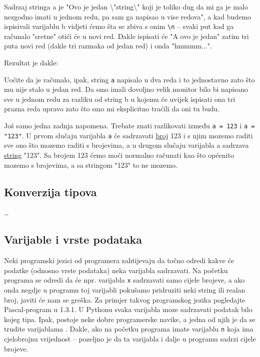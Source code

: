 	Sadrzaj stringa a je "Ovo je jedan $\setminus$"string$\setminus$" koji je toliko dug da mi ga je malo nezgodno imati u jednom redu, pa sam ga napisao u vise redova",
	a kad budemo ispisivali varijablu b vidjeti ćemo šta se zbiva s onim
	\verb+\n+ -- svaki put kad ga računalo "sretne" otići će u novi red.
	Dakle ispisati će "A ovo je jedan" zatim tri puta novi red (dakle tri razmaka
	od jedan red) i onda "hmmmm...".

	Rezultat je dakle:


Uočite da je računalo, ipak, string \verb+a+ napisalo u
dva reda i to jednostavno zato što mu nije stalo u jedan red.
Da smo imali dovoljno velik monitor bilo bi napisano sve u jednom
redu za razliku od string b u kojemu će uvijek ispisati ona
tri prazna reda upravo zato što smo mi eksplicitno traćili
da oni tu budu.

Još samo jedna zadnja napomena. Trebate znati razlikovati
između \verb+a = 123+ i \verb+a = "123"+. U prvom slučaju
varijabla \verb+a+ će sadrzavati \underline{broj} 123 i s
njim mozemo raditi sve ono što mozemo raditi s brojevima,
a u drugom slučaju varijabla a sadrzava \underline{string}
"123". Sa brojem 123 ćemo moći normalno računati kao
što općenito mozemo s brojevima, a sa stringom "123"
to ne mozemo.

\subsection{Konverzija tipova}

\dots

\subsection{Varijable i vrste podataka}

Neki programski jezici od programera zahtijevaju da točno odredi
kakve će podatke (odnosno vrste podataka) neka varijabla
sadrzavati. Na početku programa se odredi da će npr.
varijabla \verb+x+ sadrzavati samo cijele brojeve, a ako onda
negdje u programu toj varijabli pokušamo pridruziti neki
string ili realan broj, javiti će nam se greška. Za primjer
takvog programskog jezika pogledajte Pascal-program u 1.3.1.  U
Pythonu svaka varijabla moze sadrzavati podatak bilo kojeg
tipa. Ipak, postoje neke dobre programerske navike, a jedna od njih
je da se trudite varijablama . Dakle, ako na početku programa
imate varijablu \verb+n+ koja ima cjelobrojnu vrijednost --
pozeljno je da ta varijabla i dalje u programu sadrzi cijele
brojeve.

